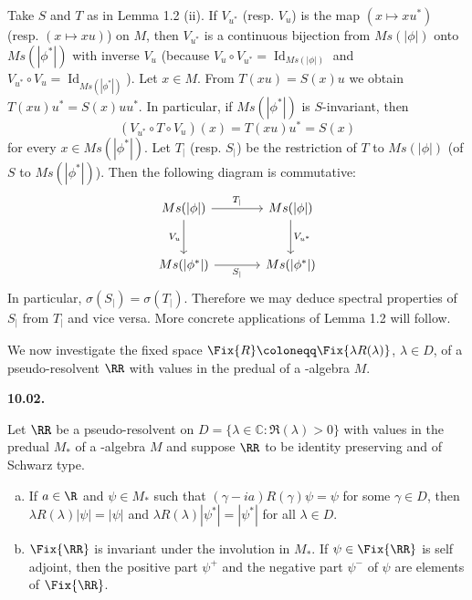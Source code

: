 \begin{remark}\label{rem:d3-1.3}
Take $S$ and $T$ as in Lemma 1.2 (ii).
If $V_{u^{*}}$ (resp. $V_u$) is the map $(x \mapsto xu^{*})$ (resp. $(x \mapsto xu)$) on $M$, then $V_{u^{*}}$ is a continuous bijection from $Ms(|\phi|)$ onto $Ms(|\phi^{*}|)$ with inverse $V_u$ (because $V_u \circ V_{u^{*}} = \operatorname{Id}_{Ms(|\phi|)}$ and $V_{u^{*}} \circ V_u = \operatorname{Id}_{Ms(|\phi^{*}|)}$).
Let $x \in M$.
From $T(xu) = S(x)u$ we obtain $T(xu)u^{*} = S(x)uu^{*}$.
In particular, if $Ms(|\phi^{*}|)$ is $S$-invariant, then
\[
	(V_{u^{*}} \circ T \circ V_u)(x) = T(xu)u^{*} = S(x)
\]
for every $x \in Ms(|\phi^{*}|)$.
Let $T_{|}$ (resp. $S_{|}$) be the restriction of $T$ to $Ms(|\phi|)$ (\resp of $S$ to $Ms(|\phi^{*}|)$).
Then the following diagram is commutative:
\begin{equation*}
\begin{tikzcd}[column sep=large, row sep=large, scale=1.5]
Ms(|\phi|) \arrow[r, "T_{|}"] \arrow[d, "V_u"'] & Ms(|\phi|) \arrow[d, "V_{u^{*}}"] \\
Ms(|\phi^{*}|) \arrow[r, "S_{|}"'] & Ms(|\phi^{*}|)
\end{tikzcd}
\end{equation*}
In particular, $\sigma(S_{|}) = \sigma(T_{|})$.
Therefore we may deduce spectral properties of $S_{|}$ from $T_{|}$ and vice versa.
More concrete applications of Lemma 1.2 will follow.
\end{remark}
We now investigate the fixed space $\Fix{R} \coloneqq \Fix{\lambda R(\lambda)}$, $\lambda \in D$, of a pseudo-resolvent $\RR$ with values in the predual of a \WA-algebra $M$.

\textbf{10.02.} 

\newpage

\begin{proposition}\label{prop:d3-1.4}
Let $\RR$ be a pseudo-resolvent on $D = \{\lambda \in \mathbb{C} \colon \Re(\lambda) > 0\}$ with values in the predual $M_*$ of a \WA-algebra $M$ and suppose $\RR$ to be identity preserving and of Schwarz type.

\begin{enumerate}[(a)]
\item 
If $a \in \R$ and $\psi \in M_*$ such that $(\gamma - ia)R(\gamma)\psi = \psi$ for some $\gamma \in D$, then $\lambda R(\lambda)|\psi| = |\psi|$ and $\lambda R(\lambda)|\psi^{*}| = |\psi^{*}|$ for all $\lambda \in D$.

\item 
$ \Fix{\RR} $ is invariant under the involution in $M_*$.
If $\psi \in \Fix{\RR} $ is self adjoint, then the positive part $\psi^{+}$ and the negative part $\psi^{-}$ of $\psi$ are elements of $ \Fix{\RR} $.
\end{enumerate}
\end{proposition}

